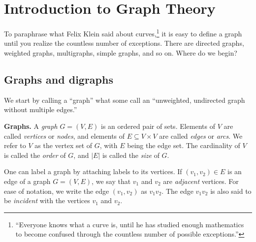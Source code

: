 
\chapter{Introduction to Graph Theory}
\label{chap:introduction}

To paraphrase what Felix Klein said about curves,\footnote{
``Everyone knows what a curve is, until he has studied enough
mathematics to become confused through the countless number of
possible exceptions.''}
it is easy to define a graph until you realize the countless number of
exceptions. There are directed graphs, weighted graphs, multigraphs,
simple graphs, and so on. Where do we begin?



\section{Graphs and digraphs}

We start by calling a ``graph'' what some call an ``unweighted,
undirected graph without multiple edges.''

\begin{definition}
\textbf{Graphs.}
A \emph{graph} $G = (V, E)$ is an ordered pair of sets. Elements of
$V$ are called \emph{vertices} or \emph{nodes}, and elements of
$E \subseteq V \times V$ are called \emph{edges} or \emph{arcs}. We
refer to $V$ as the vertex set of $G$, with $E$ being the edge
set. The cardinality of $V$ is called the \emph{order} of $G$, and
$|E|$ is called the \emph{size} of $G$.
\end{definition}

One can label a graph by attaching labels to its vertices. If $(v_1,
v_2) \in E$ is an edge of a graph $G = (V, E)$, we say that $v_1$ and
$v_2$ are \emph{adjacent} vertices. For ease of notation, we write the
edge $(v_1, v_2)$ as $v_1 v_2$. The edge $v_1 v_2$ is also said to be
\emph{incident} with the vertices $v_1$ and $v_2$.

